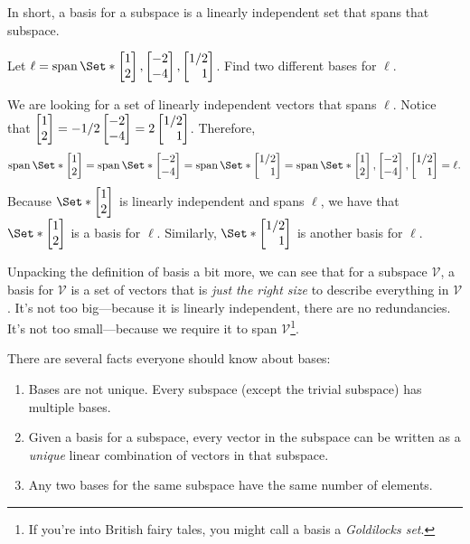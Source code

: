 
In short, a basis for a subspace is a linearly independent set that spans that
subspace.

\begin{example}
	\label{EXLINEBASIS}
	Let $\ell=\Span\Set*{\mat{1\\2},\mat{-2\\-4}, \mat{1/2\\1}}$. Find
	two different bases for $\ell$.
	
	We are looking for a set of linearly independent vectors that spans $\ell$.
	Notice that $\mat{1\\2} = -1/2\mat{-2\\-4} = 2\mat{1/2\\1}$.
	Therefore,
    \[
		\Span\Set*{\mat{1\\2}} =
		\Span\Set*{\mat{-2\\-4}} =
		\Span\Set*{\mat{1/2\\1}} =
		\Span\Set*{\mat{1\\2},\mat{-2\\-4}, \mat{1/2\\1}} =
		\ell.
	\]
	Because $\Set*{\mat{1\\2}}$ is linearly independent and spans $\ell$,
	we have that $\Set*{\mat{1\\2}}$ is a basis for $\ell$.
	Similarly, $\Set*{\mat{1/2\\1}}$ is another basis for $\ell$.
\end{example}

Unpacking the definition of basis a bit more, we can see that for a 
subspace $\mathcal V$, a basis for $\mathcal V$ is a set of vectors
that is \emph{just the right size} to describe everything in $\mathcal V$.
It's not too big---because it is linearly independent, there are no
redundancies. It's not too small---because we require it to span $\mathcal V$\footnote{ 
If you're into British fairy tales, you might call a basis a \emph{Goldilocks set}.
}.

There are several facts everyone should know about bases:
\begin{enumerate}
	\item Bases are not unique. Every subspace (except the trivial subspace)
		has multiple bases.
	\item Given a basis for a subspace, every vector in the subspace can be written
		as a \emph{unique} linear combination of vectors in that subspace.
	\item Any two bases for the same subspace have the same number of elements.
\end{enumerate}

